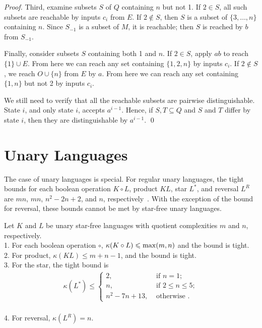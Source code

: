 \documentclass{llncs}
\renewcommand{\le}{\leqslant}
\begin{document}
\begin{proof}
Third,  examine subsets $S$ of $Q$ containing $n$ but not 1.
If $2\in S$, all such subsets are reachable by inputs $c_i$ from $E$.
If $2\not\in S$, then  $S$ is a subset of $\{3,\ldots,n\}$ containing $n$. 
Since  $S_{-1}$   is a subset of $M$, it is reachable; then $S$ is reached  by  $b$ from $S_{-1}$.

Finally, consider subsets $S$ containing both 1 and $n$.
If $2\in S$, apply $ab$ to reach $\{1\}\cup E$. From here we can reach any set containing $\{1,2,n\}$ by inputs $c_i$.
If $2\not\in S$, we reach $O\cup \{n\}$ from $E$ by $a$.
From here we can reach any set containing $\{1,n\}$ but not 2 by inputs $c_i$.

We still need to verify that all the reachable subsets are pairwise distinguishable. 
State $i$, and only state $i$, accepts $a^{i-1}$.  Hence, if $S,T\subseteq Q$ and $S$ and $T$ differ by state $i$, then they are distinguishable by $a^{i-1}$.
\qed
\end{proof}
\section{Unary Languages}
\label{sec:unary}
The case of unary languages is special. For regular unary languages, the tight bounds for each boolean operation $K\circ L$, product $KL$, star $L^*$, and reversal $L^R$ are $mn$, $mn$, $n^2-2n+2$, and $n$, respectively~\cite{YZS94}. With the exception of the bound for reversal, these bounds cannot be met by star-free unary languages.


\begin{theorem}
\label{thm:unary}
Let $K$ and $L$ be unary star-free languages with quotient complexities $m$ and $n$, respectively. \\
    1. 
For each boolean operation  $\circ$, $\kappa(K\circ L)\le {\rm max}(m,n)$ and the bound is tight.\\
   2. 
For product,  $\kappa(KL)\le m+n-1$, 
and the bound is tight.\\ 
   3. For the star, the tight bound is
 \begin{align*}
	\kappa(L^*) \le \left\{\begin{array}{cl}
		2,	& \text{ if }	 n=1; \\
    		n,	& \text{ if }	 2\le n\le 5;\\
		n^2-7n+13,	& \text{ otherwise }.
         	\end{array}\right.
  \end{align*}\\
   4. For reversal, $\kappa(L^R)=n$.
\end{theorem}
\end{document}
